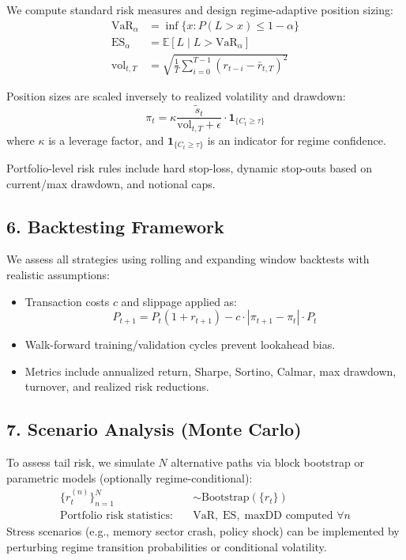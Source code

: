 We compute standard risk measures and design regime-adaptive position sizing:
\begin{align}
\text{VaR}_\alpha &= \inf \{ x : P(L > x) \leq 1 - \alpha \} \\
\text{ES}_\alpha &= \mathbb{E}[L \mid L > \text{VaR}_\alpha] \\
\mathrm{vol}_{t,T} &= \sqrt{ \frac{1}{T} \sum_{i=0}^{T-1} (r_{t-i} - \bar{r}_{t,T})^2 }
\end{align}

Position sizes are scaled inversely to realized volatility and drawdown:
\begin{equation}
\pi_t = \kappa \frac{\tilde{s}_t}{\mathrm{vol}_{t, T} + \epsilon} \cdot \mathbf{1}_{\{ C_t \geq \tau \}}
\end{equation}
where $\kappa$ is a leverage factor, and $\mathbf{1}_{\{ C_t \geq \tau \}}$ is an indicator for regime confidence.

Portfolio-level risk rules include hard stop-loss, dynamic stop-outs based on current/max drawdown, and notional caps.

\subsection{6. Backtesting Framework}

We assess all strategies using rolling and expanding window backtests with realistic assumptions:
\begin{itemize}
  \item Transaction costs $c$ and slippage applied as:
  \begin{equation}
  P_{t+1} = P_t (1 + r_{t+1}) - c \cdot | \pi_{t+1} - \pi_{t} | \cdot P_t
  \end{equation}
  \item Walk-forward training/validation cycles prevent lookahead bias.
  \item Metrics include annualized return, Sharpe, Sortino, Calmar, max drawdown, turnover, and realized risk reductions.
\end{itemize}

\subsection{7. Scenario Analysis (Monte Carlo)}

To assess tail risk, we simulate $N$ alternative paths via block bootstrap or parametric models (optionally regime-conditional):
\begin{align}
\{ r_{t}^{(n)} \}_{n=1}^N &\sim \mathrm{Bootstrap}( \{ r_t \} ) \\
\text{Portfolio risk statistics:}\quad &\text{VaR},\; \text{ES},\; \text{maxDD} \text{ computed $\forall n$}
\end{align}
Stress scenarios (e.g., memory sector crash, policy shock) can be implemented by perturbing regime transition probabilities or conditional volatility.

